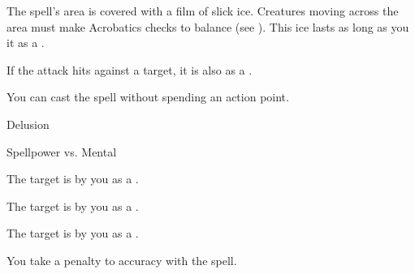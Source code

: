 
The spell's area is covered with a film of slick ice.
Creatures moving across the area must make Acrobatics checks to balance (see ).
This ice lasts as long as you  it as a .







If the attack hits against a target, it is also  as a .






You can cast the spell without spending an action point.




\newpage
\begin{spellsection}{Delusion}

\begin{spellheader}
\end{spellheader}

\begin{spellcontent}

\begin{spelltargetinginfo}




\end{spelltargetinginfo}


\begin{spelleffects}




\begin{spellattack}{Spellpower vs. Mental}


\spellsuccess The target is \frightened by you as a .


\spellcritical The target is \panicked by you as a .


\spellfailure The target is \shaken by you as a .


\end{spellattack}





\end{spelleffects}

\end{spellcontent}
\begin{spellfooter}


\end{spellfooter}
\begin{spellsubcontent}


\begin{spellcantrip}

You take a  penalty to accuracy with the spell.

\end{spellcantrip}


\end{spellsubcontent}
\end{spellsection}


